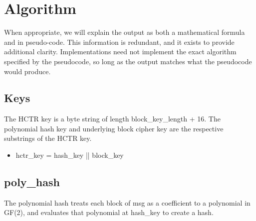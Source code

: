 \documentclass[i-d]{rfc}
\begin{document}
\section{Algorithm}

When appropriate, we will explain the output as both a mathematical formula and in pseudo-code.  This information is redundant, and it exists to provide additional clarity.  Implementations need not implement the exact algorithm specified by the pseudocode, so long as the output matches what the pseudocode would produce.

\subsection{Keys}

The HCTR key is a byte string of length block\_key\_length + 16. The polynomial hash key and underlying block cipher key are the respective substrings of the HCTR key.

\begin{itemize}
    \item hctr\_key = hash\_key || block\_key
\end{itemize}

\subsection{poly\_hash}

The polynomial hash treats each block of msg as a coefficient to a polynomial in GF(2), and evaluates that polynomial at hash\_key to create a hash. 
\end{document}
